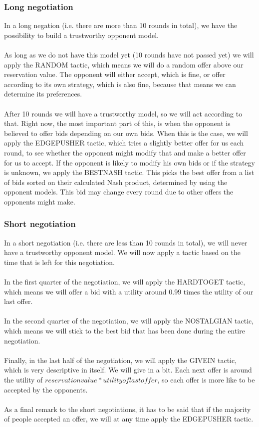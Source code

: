 \subsubsection{Long negotiation}
In a long negation (i.e. there are more than 10 rounds in total), we have the possibility to build a trustworthy opponent model.
\\\\
As long as we do not have this model yet (10 rounds have not passed yet) we will apply the RANDOM tactic, which means we will do a random offer above our reservation value. The opponent will either accept, which is fine, or offer according to its own strategy, which is also fine, because that means we can determine its preferences.
\\\\
After 10 rounds we will have a trustworthy model, so we will act according to that. Right now, the most important part of this, is when the opponent is believed to offer bids depending on our own bids. When this is the case, we will apply the EDGEPUSHER tactic, which tries a slightly better offer for us each round, to see whether the opponent might modify that and make a better offer for us to accept. If the opponent is likely to modify his own bids or if the strategy is unknown, we apply the BESTNASH tactic. This picks the best offer from a list of bids sorted on their calculated Nash product, determined by using the opponent models. This bid may change every round due to other offers the opponents might make.

\subsubsection{Short negotiation}
In a short negotiation (i.e. there are less than 10 rounds in total), we will never have a trustworthy opponent model. We will now apply a tactic based on the time that is left for this negotiation.
\\\\
In the first quarter of the negotiation, we will apply the HARDTOGET tactic, which means we will offer a bid with a utility around 0.99 times the utility of our last offer.
\\\\
In the second quarter of the negotiation, we will apply the NOSTALGIAN tactic, which means we will stick to the best bid that has been done during the entire negotiation.
\\\\
Finally, in the last half of the negotiation, we will apply the GIVEIN tactic, which is very descriptive in itself. We will give in a bit. Each next offer is around the utility of $reservation value * utility of last offer$, so each offer is more like to be accepted by the opponents.
\\\\
As a final remark to the short negotiations, it has to be said that if the majority of people accepted an offer, we will at any time apply the EDGEPUSHER tactic.

